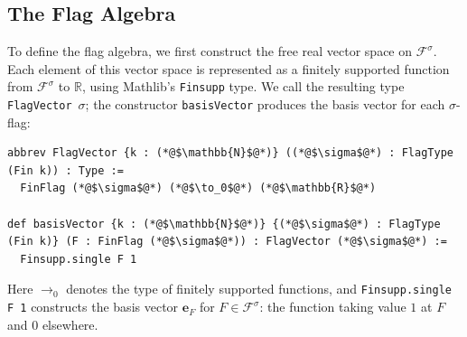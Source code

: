 \documentclass{article}
\newcommand{\lean}[1]{\texttt{#1}}
\begin{document}
\subsection{The Flag Algebra}
\label{sec:formal-flag-algebra}

To define the flag algebra, we first construct the free real vector space on
$\mathcal{F}^\sigma$.  Each element of this vector space is represented as a
finitely supported function from $\mathcal{F}^\sigma$ to $\mathbb{R}$, using
Mathlib's \lean{Finsupp} type.  We call the resulting type
\lean{FlagVector}~$\sigma$; the constructor \lean{basisVector} produces the
basis vector for each $\sigma$-flag:
\begin{lstlisting}
abbrev FlagVector {k : (*@$\mathbb{N}$@*)} ((*@$\sigma$@*) : FlagType (Fin k)) : Type :=
  FinFlag (*@$\sigma$@*) (*@$\to_0$@*) (*@$\mathbb{R}$@*)

def basisVector {k : (*@$\mathbb{N}$@*)} {(*@$\sigma$@*) : FlagType (Fin k)} (F : FinFlag (*@$\sigma$@*)) : FlagVector (*@$\sigma$@*) :=
  Finsupp.single F 1
\end{lstlisting}
Here $\to_0$ denotes the type of finitely supported functions, and \lean{Finsupp.single F 1} constructs the basis vector $\mathbf e_F$ for $F \in \mathcal{F}^\sigma$: the function taking value $1$ at $F$ and $0$ elsewhere.
\end{document}
